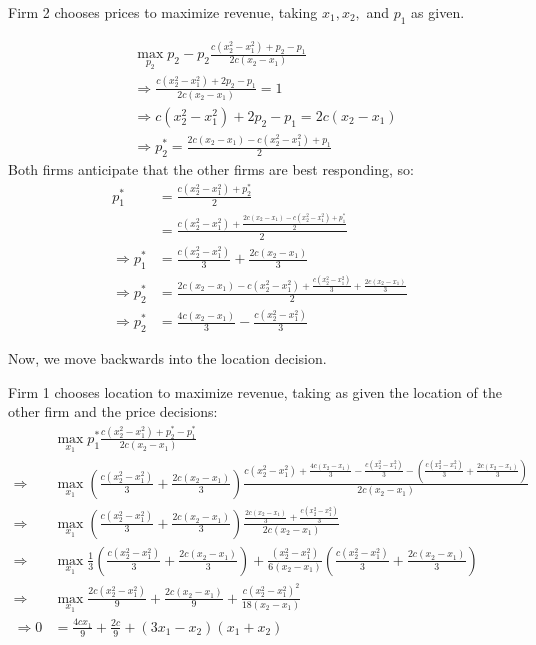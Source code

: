 \documentclass[11pt]{article} %
\begin{document}
Firm 2 chooses prices to maximize revenue, taking $x_1, x_2,$ and $p_1$ as given. 

\begin{align*}
&\max_{p_2}  p_2-p_2\frac{c(x_2^2 - x_1^2) + p_2 - p_1}{2c(x_2 - x_1)}\\
&\Rightarrow \frac{c(x_2^2 - x_1^2) + 2p_2 - p_1}{2c(x_2 - x_1)} = 1\\
&\Rightarrow c(x_2^2 - x_1^2) + 2p_2 - p_1 = 2c(x_2 - x_1)\\
&\Rightarrow p_2^{*} = \frac{ 2c(x_2 - x_1) - c(x_2^2 - x_1^2) + p_1 }{2}
\end{align*}
Both firms anticipate that the other firms are best responding, so:
\begin{align*}
 p_1^{*} &= \frac{c(x_2^2 - x_1^2) + p_2^{*}}{2}\\
&= \frac{c(x_2^2 - x_1^2) + \frac{ 2c(x_2 - x_1) - c(x_2^2 - x_1^2) + p_1^{*} }{2}}{2}\\
\Rightarrow p_1^{*} &= \frac{c(x_2^2 - x_1^2)}{3} + \frac{2c(x_2 - x_1)}{3}\\
\Rightarrow p_2^{*} &=  \frac{ 2c(x_2 - x_1) - c(x_2^2 - x_1^2) +  \frac{c(x_2^2 - x_1^2)}{3} + \frac{2c(x_2 - x_1)}{3} }{2}\\
\Rightarrow p_2^{*} &= \frac{4c(x_2 - x_1)}{3} - \frac{c(x_2^2 - x_1^2)}{3}
\end{align*}

Now, we move backwards into the location decision. 

Firm 1 chooses location to maximize revenue, taking as given the location of the other firm and the price decisions:
\begin{align*}
&\max_{x_1} p_1^{*}\frac{c(x_2^2 - x_1^2) + p_2^{*} - p_1^{*}}{2c(x_2 - x_1)}\\
\Rightarrow &\max_{x_1} \left( \frac{c(x_2^2 - x_1^2)}{3} + \frac{2c(x_2 - x_1)}{3}\right)\frac{c(x_2^2 - x_1^2) + \frac{4c(x_2 - x_1)}{3} - \frac{c(x_2^2 - x_1^2)}{3} - \left( \frac{c(x_2^2 - x_1^2)}{3} + \frac{2c(x_2 - x_1)}{3}\right)}{2c(x_2 - x_1)}\\
\Rightarrow &\max_{x_1} \left( \frac{c(x_2^2 - x_1^2)}{3} + \frac{2c(x_2 - x_1)}{3}\right)\frac{ \frac{2c(x_2 - x_1)}{3} + \frac{c(x_2^2 - x_1^2)}{3} }{2c(x_2 - x_1)}\\
\Rightarrow &\max_{x_1} \frac{1}{3}\left( \frac{c(x_2^2 - x_1^2)}{3} + \frac{2c(x_2 - x_1)}{3}\right) +\frac{(x_2^2 - x_1^2)}{6(x_2 - x_1)}\left( \frac{c(x_2^2 - x_1^2)}{3} + \frac{2c(x_2 - x_1)}{3}\right) \\
\Rightarrow &\max_{x_1} \frac{2c(x_2^2 - x_1^2)}{9} + \frac{2c(x_2 - x_1)}{9}+\frac{c(x_2^2 - x_1^2)^2}{18(x_2 - x_1)} \\
\Rightarrow 0&= \frac{4cx_1}{9} + \frac{2c}{9} + (3x_1 - x_2)(x_1 + x_2)\\
\end{align*}
\end{document}
